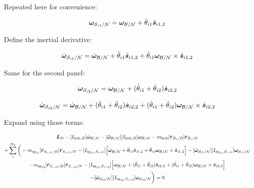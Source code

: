 \documentclass[paper]{aiaaNew}
\begin{document}
Repeated here for convenience:

\begin{equation}
\bm \omega_{\mathcal{S}_{i1}/\mathcal{N}} = \bm \omega_{\cal{B/N}} + \dot{\theta}_{i1} \hat{\bm s}_{i1,2}
\end{equation}

Define the inertial derivative:

\begin{equation}
\dot{\bm \omega}_{\mathcal{S}_{i1}/\mathcal{N}} = \dot{\bm \omega}_{\cal{B/N}} + \ddot{\theta}_{i1} \hat{\bm s}_{i1,2} + \dot{\theta}_{i1} \bm \omega_{\cal{B/N}} \times \hat{\bm s}_{i1,2}
\end{equation}

Same for the second panel:

\begin{equation}
\bm \omega_{\mathcal{S}_{i2}/\mathcal{N}} = \bm \omega_{\cal{B/N}} + (\dot{\theta}_{i1}  + \dot{\theta}_{i2})\hat{\bm s}_{i2,2}
\end{equation}

\begin{equation}
\dot{\bm \omega}_{\mathcal{S}_{i2}/\mathcal{N}} = \dot{\bm \omega}_{\cal{B/N}} + (\ddot{\theta}_{i1}  + \ddot{\theta}_{i2})\hat{\bm s}_{i2,2} + (\dot{\theta}_{i1}  + \dot{\theta}_{i2}) \bm \omega_{\cal{B/N}} \times \hat{\bm s}_{i2,2}
\end{equation}

Expand using those terms:

\begin{multline}
\bm L_B -[I_{\text{hub},B}] \dot{\bm\omega}_{\cal B/N}  -[\bm{\tilde{\omega}}_{\cal B/N}] [I_{\text{hub},B}] \bm\omega_{\cal B/N} - m_{\text{hub}} [\tilde{{\bm r}}_{B_c/B}] \ddot{\bm r}_{B_c/N} \\
+ \sum\limits_{i}^{N_S}\bigg(- m_{\text{sp}_{i1}} [\tilde{{\bm r}}_{S_{c,i1}/B}] \ddot{\bm r}_{S_{c,i1}/N} -[I_{\text{sp}_{i1},S_{c,i1}}] \Big[\dot{\bm \omega}_{\cal{B/N}} + \ddot{\theta}_{i1} \hat{\bm s}_{i1,2} + \dot{\theta}_{i1} \bm \omega_{\cal{B/N}} \times \hat{\bm s}_{i1,2}\Big]  -[\tilde{\bm \omega}_{\mathcal{S}_{i1}/\mathcal{N}}] [I_{\text{sp}_{i1},S_{c,i1}}] \bm \omega_{\mathcal{S}_{i1}/\mathcal{N}}\\
- m_{\text{sp}_{i2}} [\tilde{{\bm r}}_{S_{c,i2}/B}] \ddot{\bm r}_{S_{c,i2}/N} -[I_{\text{sp}_{i2},S_{c,i2}}] \Big[\dot{\bm \omega}_{\cal{B/N}} + (\ddot{\theta}_{i1}  + \ddot{\theta}_{i2})\hat{\bm s}_{i2,2} + (\dot{\theta}_{i1}  + \dot{\theta}_{i2}) \bm \omega_{\cal{B/N}} \times \hat{\bm s}_{i2,2}\Big]  \\
-[\tilde{\bm \omega}_{\mathcal{S}_{i2}/\mathcal{N}}] [I_{\text{sp}_{i2},S_{c,i2}}] \bm \omega_{\mathcal{S}_{i2}/\mathcal{N}}\bigg) = 0
\end{multline}
\end{document}
